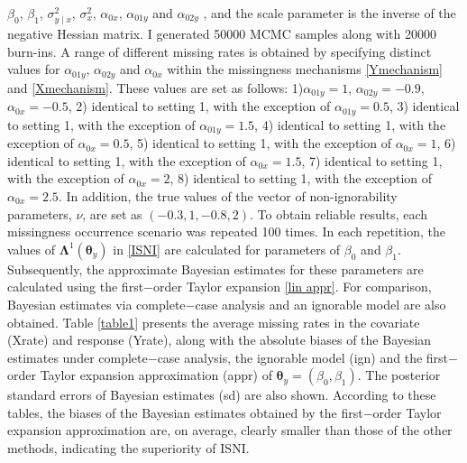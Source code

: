 \documentclass[twoside]{article}
\begin{document}
$\beta_0$, $\beta_1$, $\sigma^2_{y\mid x}$, $\sigma^2_x$, $\alpha_{0x}$, $\alpha_{01y}$ and $\alpha_{02y}$ , and the scale parameter is  the inverse of the negative Hessian matrix. I generated 50000 MCMC samples along with 20000 burn-ins.
A range of different missing rates is obtained by specifying distinct values for $\alpha_{01y}$, $\alpha_{02y}$ and $\alpha_{0x}$ within the missingness mechanisms \eqref{Ymechanism} and \eqref{Xmechanism}. These values are set as follows: 1)$\alpha_{01y}=1$, $\alpha_{02y}=-0.9$, $\alpha_{0x}=-0.5$, 2) identical to setting 1, with the exception of $\alpha_{01y}=0.5$, 3) identical to setting 1, with the exception of $\alpha_{01y}=1.5$, 4) identical to setting 1, with the exception of $\alpha_{0x}=0.5$, 5) identical to setting 1, with the exception of $\alpha_{0x}=1$, 6) identical to setting 1, with the exception of $\alpha_{0x}=1.5$, 7) identical to setting 1, with the exception of $\alpha_{0x}=2$, 8) identical to setting 1, with the exception of $\alpha_{0x}=2.5$. In addition, the true values of the vector of non-ignorability parameters, $\nu$, are set as $(-0.3,1,-0.8,2)$.  To obtain reliable results, each missingness occurrence scenario   was repeated 100 times. In each repetition, the values of $\pmb\Lambda^{1}(\pmb\theta _y)$ in \eqref{ISNI} are calculated for parameters of $\beta_0$ and $\beta_1$. Subsequently,  the approximate Bayesian estimates for these parameters are calculated using the first$-$order  Taylor expansion \eqref{lin appr}. For comparison, Bayesian estimates via complete$-$case analysis and an ignorable model are also obtained.
Table \ref{table1} 
presents the average missing rates in the covariate (Xrate) and response (Yrate), along with the absolute biases of the Bayesian estimates under complete$-$case analysis, the ignorable model (ign) and  the first$-$order Taylor expansion approximation (appr) of $\pmb\theta_y=(\beta_0 , \beta_1)$. The posterior standard errors of Bayesian estimates (sd) are also shown. According to these tables,   the biases of the Bayesian estimates obtained by  the first$-$order Taylor expansion approximation are, on average,  clearly smaller than those of the other methods, indicating the superiority of ISNI.
\setlength{\textfloatsep}{4pt}
\setlength{\tabcolsep}{4pt}
\end{document}
